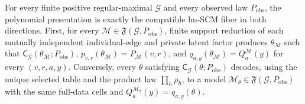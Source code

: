 For every finite positive regular-maximal \(\mathcal G\) and every observed law \(P_{\mathrm{obs}}\), the polynomial presentation is exactly the compatible lm-SCM fiber in both directions. First, for every \(\mathcal M\in\mathfrak F(\mathcal G,P_{\mathrm{obs}})\), finite support reduction of each mutually independent individual-edge and private latent factor produces \(\theta_{\mathcal M}\) such that \(\mathsf C_{\mathcal G}(\theta_{\mathcal M};P_{\mathrm{obs}})\), \(p_{v,r}(\theta_{\mathcal M})=P_{\mathcal M}(v,r)\), and \(q_{a,y}(\theta_{\mathcal M})=Q_a^{\mathcal M}(y)\) for every \((v,r,a,y)\). Conversely, every \(\theta\) satisfying \(\mathsf C_{\mathcal G}(\theta;P_{\mathrm{obs}})\) decodes, using the unique selected table and the product law \(\prod_h\rho_h\), to a model \(\mathcal M_{\theta}\in\mathfrak F(\mathcal G,P_{\mathrm{obs}})\) with the same full-data cells and \(Q_a^{\mathcal M_{\theta}}(y)=q_{a,y}(\theta)\).